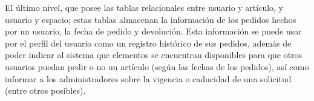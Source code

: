 El último nivel, que posee las tablas relacionales entre usuario y artículo, y usuario y espacio; estas tablas almacenan la información de los pedidos hechos por un usuario, la fecha de pedido y devolución. Esta información se puede usar por el perfil del usuario como un registro histórico de sus pedidos, además de poder indicar al sistema que elementos se encuentran disponibles para que otros usuarios puedan pedir o no un artículo (según las fechas de los pedidos), así como informar a los administradores sobre la vigencia o caducidad de una solicitud (entre otros posibles). 